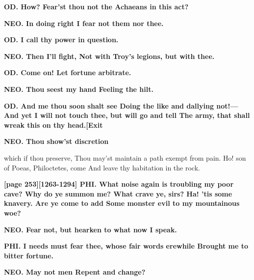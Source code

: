 \documentclass[11pt,letter]{book}
\begin{document}
\par \textbf{OD. How? Fear’st thou not the Achaeans in this act?}
\par 

\par \textbf{NEO. In doing right I fear not them nor thee.}
\par 

\par \textbf{OD. I call thy power in question.}
\par 

\par \textbf{NEO. Then I’ll fight, Not with Troy’s legions, but with thee.}
\par 

\par \textbf{OD. Come on! Let fortune arbitrate.}
\par 

\par \textbf{NEO. Thou seest my hand Feeling the hilt.}
\par 

\par \textbf{OD. And me thou soon shalt see Doing the like and dallying not!—And yet I will not touch thee, but will go and tell The army, that shall wreak this on thy head.[Exit}
\par 

\par \textbf{NEO. Thou show’st discretion}
\par   which if thou preserve, Thou may’st maintain a path exempt from pain. Ho! son of Poeas, Philoctetes, come And leave thy habitation in the rock.

\par \textbf{[page 253][1263-1294] PHI. What noise again is troubling my poor cave? Why do ye summon me? What crave ye, sirs? Ha! ’tis some knavery. Are ye come to add Some monster evil to my mountainous woe?}
\par 

\par \textbf{NEO. Fear not, but hearken to what now I speak.}
\par 

\par \textbf{PHI. I needs must fear thee, whose fair words erewhile Brought me to bitter fortune.}
\par 

\par \textbf{NEO. May not men Repent and change?}
\par 
\end{document}
